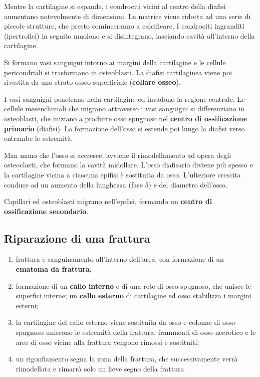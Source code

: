 Mentre la cartilagine si espande, i condrociti vicini al centro della diafisi aumentano notevolmente di dimensioni. La matrice viene ridotta ad una serie di piccole strutture, che presto cominceranno a calcificare. I condrociti ingranditi (ipertrofici) in seguito muoiono e si disintegrano, lasciando cavità all'interno della cartilagine.

Si formano vasi sanguigni intorno ai margini della cartilagine e le cellule pericondriali si trasformano in osteoblasti. La diafisi cartilaginea viene poi rivestita da uno strato osseo superficiale (\textbf{collare osseo}).

I vasi sanguigni penetrano nella cartilagine ed invadono la regione centrale. Le cellule mesenchimali che migrano attraverso i vasi sanguigni si differenziano in osteoblasti, che iniziano a produrre osso spugnoso nel \textbf{centro di ossificazione primario} (diafisi). La formazione dell'osso si estende poi lungo la diafisi verso entrambe le estremità.

Man mano che l'osso si accresce, avviene il rimodellamento ad opera degli osteoclasti, che formano la cavità midollare. L'osso diafisario diviene più spesso e la cartilagine vicina a ciascuna epifisi è sostituita da osso. L'ulteriore crescita conduce ad un aumento della lunghezza (fase 5) e del diametro dell'osso.

Capillari ed osteoblasti migrano nell'epifisi, formando un \textbf{centro di ossificazione secondario}.

\subsection{Riparazione di una frattura}

\begin{enumerate}
  \item frattura e sanguinamento all'interno dell'area, con formazione di un \textbf{ematoma da frattura};
  \item formazione di un \textbf{callo interno} e di una rete di osso spugnoso, che unisce le superfici interne; un \textbf{callo esterno} di cartilagine ed osso stabilizza i margini esterni;
  \item la cartilagine del callo esterno viene sostituita da osso e colonne di osso spugnoso uniscono le estremità della frattura; frammenti di osso necrotico e le aree di osso vicine alla frattura vengono rimossi e sostituiti;
  \item un rigonfiamento segna la zona della frattura, che successivamente verrà rimodellata e rimarrà solo un lieve segno della frattura.
\end{enumerate}
